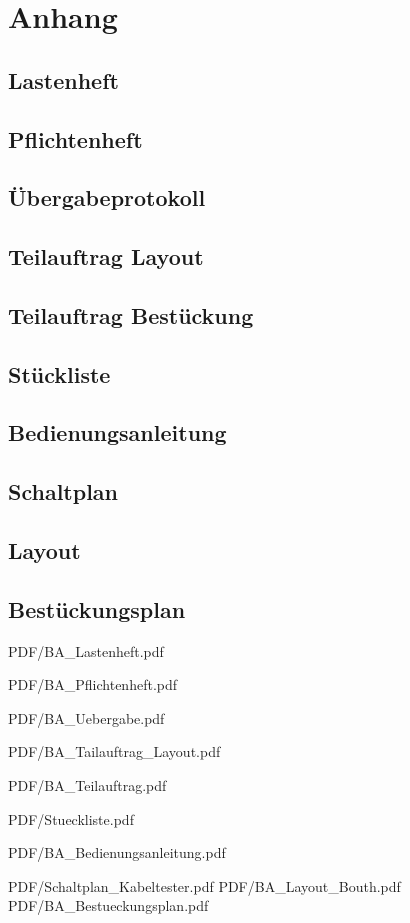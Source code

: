 \section{Anhang}

\subsection{Lastenheft}
\subsection{Pflichtenheft}
\subsection{Übergabeprotokoll}
\subsection{Teilauftrag Layout}
\subsection{Teilauftrag Bestückung}
\subsection{Stückliste}
\subsection{Bedienungsanleitung}
\subsection{Schaltplan}
\subsection{Layout}
\subsection{Bestückungsplan}



 {PDF/BA_Lastenheft.pdf}

 {PDF/BA_Pflichtenheft.pdf}

 {PDF/BA_Uebergabe.pdf}

 {PDF/BA_Tailauftrag_Layout.pdf}

 {PDF/BA_Teilauftrag.pdf}

 {PDF/Stueckliste.pdf}

 {PDF/BA_Bedienungsanleitung.pdf}

 {PDF/Schaltplan_Kabeltester.pdf}
%
 {PDF/BA_Layout_Bouth.pdf}
%
 {PDF/BA_Bestueckungsplan.pdf}



